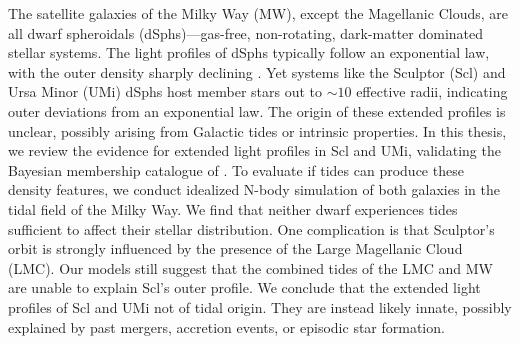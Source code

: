 The satellite galaxies of the Milky Way (MW), except the Magellanic
Clouds, are all dwarf spheroidals (dSphs)---gas-free, non-rotating,
dark-matter dominated stellar systems. The light profiles of dSphs
typically follow an exponential law, with the outer density sharply
declining . Yet systems like the Sculptor (Scl) and Ursa Minor (UMi)
dSphs host member stars out to \(\sim10\) effective radii, indicating
outer deviations from an exponential law. The origin of these extended
profiles is unclear, possibly arising from Galactic tides or intrinsic
properties. In this thesis, we review the evidence for extended light
profiles in Scl and UMi, validating the Bayesian membership catalogue of
\citet{jensen+2024}. To evaluate if tides can produce these density
features, we conduct idealized N-body simulation of both galaxies in the
tidal field of the Milky Way. We find that neither dwarf experiences
tides sufficient to affect their stellar distribution. One complication
is that Sculptor's orbit is strongly influenced by the presence of the
Large Magellanic Cloud (LMC). Our models still suggest that the combined
tides of the LMC and MW are unable to explain Scl's outer profile. We
conclude that the extended light profiles of Scl and UMi not of tidal
origin. They are instead likely innate, possibly explained by past
mergers, accretion events, or episodic star formation.
